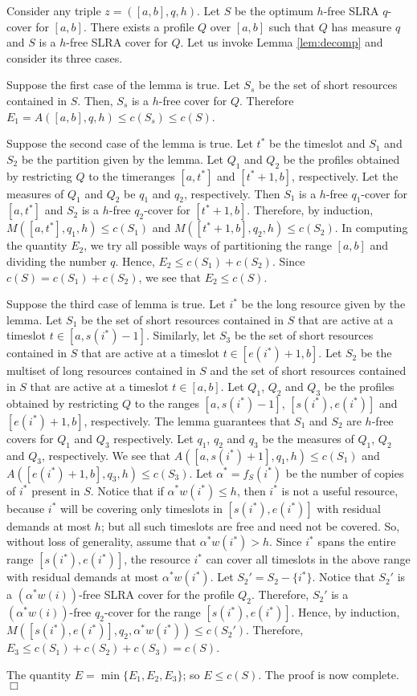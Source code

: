 \documentclass[11pt]{article}
\newcommand{\qed} {\hfill$\Box$}
\begin{document}
Consider any triple $z=([a,b],q,h)$. Let $S$ be the optimum $h$-free SLRA $q$-cover for $[a,b]$.
There exists a profile $Q$ over $[a,b]$ such that $Q$ has measure $q$ and $S$ is a $h$-free SLRA cover
for $Q$. Let us invoke Lemma \ref{lem:decomp} and consider its three cases.

Suppose the first case of the lemma is true.
Let $S_s$ be the set of short resources contained in $S$. 
Then, $S_s$ is a $h$-free cover for $Q$. Therefore $E_1=A([a,b],q,h)\leq c(S_s) \leq c(S)$.

Suppose the second case of the lemma is true.
Let $t^*$ be the timeslot and $S_1$ and $S_2$ be the partition given by the lemma.
Let $Q_1$ and $Q_2$ be the profiles obtained by restricting $Q$ to the timeranges $[a,t^*]$ and $[t^*+1,b]$,
respectively. Let the measures of $Q_1$ and $Q_2$ be $q_1$ and $q_2$, respectively.
Then $S_1$ is a $h$-free $q_1$-cover for $[a,t^*]$ and $S_2$ is a $h$-free $q_2$-cover for $[t^*+1,b]$.
Therefore, by induction, $M([a,t^*],q_1,h)\leq c(S_1)$ 
and $M([t^*+1,b],q_2,h)\leq c(S_2)$.
In computing the quantity $E_2$, we try all possible ways of partitioning the range $[a,b]$ and dividing the number $q$.
Hence, $E_2\leq c(S_1)+c(S_2)$. Since $c(S)=c(S_1)+c(S_2)$, we see that $E_2\leq c(S)$.

Suppose the third case of lemma is true.
Let $i^*$ be the long resource given by the lemma.
Let $S_1$ be the set of short resources contained in $S$ that are active at a timeslot $t\in[a,s(i^*)-1]$.
Similarly, let $S_3$ be the set of short resources contained in $S$ that are active at a timeslot $t\in[e(i^*)+1,b]$.
Let $S_2$ be the multiset of long resources contained in $S$ and the set of short resources contained in $S$
that are active at a timeslot $t\in [a,b]$.
Let $Q_1$, $Q_2$ and $Q_3$ be the profiles obtained by restricting $Q$ to the ranges $[a,s(i^*)-1]$,
$[s(i^*),e(i^*)]$ and $[e(i^*)+1,b]$, respectively.
The lemma guarantees that $S_1$ and $S_2$ are $h$-free covers for $Q_1$ and $Q_3$ respectively.
Let $q_1$, $q_2$ and $q_3$ be the measures of $Q_1$, $Q_2$ and $Q_3$, respectively.
We see that $A([a,s(i^*)+1],q_1,h)\leq c(S_1)$ and $A([e(i^*)+1,b],q_3,h)\leq c(S_3)$.
Let $\alpha^*=f_S(i^*)$ be the number of copies of $i^*$ present in $S$.
Notice that if $\alpha^* w(i^*)\leq h$, then $i^*$ is not a useful resource,
because $i^*$ will be covering only timeslots in $[s(i^*),e(i^*)]$ with residual demands at most $h$;
but all such timeslots are free and need not be covered.
So, without loss of generality, assume that $\alpha^* w(i^*)>h$.
Since $i^*$ spans the entire range $[s(i^*),e(i^*)]$, 
the resource $i^*$ can cover all timeslots in the above range with residual demands at most $\alpha^* w(i^*)$.
Let $S_2'=S_2-\{i^*\}$. Notice that $S_2'$ is a $(\alpha^* w(i))$-free SLRA cover for the profile $Q_2$.
Therefore, $S_2'$ is a $(\alpha^* w(i))$-free $q_2$-cover for the range $[s(i^*),e(i^*)]$.
Hence, by induction, $M([s(i^*),e(i^*)],q_2,\alpha^* w(i^*)) \leq c(S_2')$.
Therefore, $E_3 \leq c(S_1)+c(S_2)+c(S_3)=c(S)$.

The quantity $E= \min \{E_1, E_2, E_3\}$; so 
$E\leq c(S)$. The proof is now complete.
\qed
\end{document}
